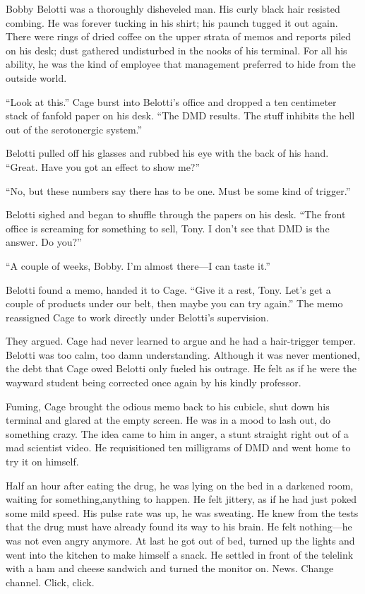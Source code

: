 Bobby Belotti was a thoroughly disheveled man. His curly black hair resisted combing. He was forever tucking in his shirt; his paunch tugged it out again. There were rings of dried coffee on the upper strata of memos and reports piled on his desk; dust gathered undisturbed in the nooks of his terminal. For all his ability, he was the kind of employee that management preferred to hide from the outside world.

“Look at this.” Cage burst into Belotti’s office and dropped a ten centimeter stack of fanfold paper on his desk. “The DMD results. The stuff inhibits the hell out of the serotonergic system.”

Belotti pulled off his glasses and rubbed his eye with the back of his hand. “Great. Have you got an effect to show me?”

“No, but these numbers say there has to be one. Must be some kind of trigger.”

Belotti sighed and began to shuffle through the papers on his desk. “The front office is screaming for something to sell, Tony. I don’t see that DMD is the answer. Do you?”

“A couple of weeks, Bobby. I’m almost there—I can taste it.”

Belotti found a memo, handed it to Cage. “Give it a rest, Tony. Let’s get a couple of products under our belt, then maybe you can try again.” The memo reassigned Cage to work directly under Belotti’s supervision.

They argued. Cage had never learned to argue and he had a hair-trigger temper. Belotti was too calm, too damn understanding. Although it was never mentioned, the debt that Cage owed Belotti only fueled his outrage. He felt as if he were the wayward student being corrected once again by his kindly professor.

Fuming, Cage brought the odious memo back to his cubicle, shut down his terminal and glared at the empty screen. He was in a mood to lash out, do something crazy. The idea came to him in anger, a stunt straight right out of a mad scientist video. He requisitioned ten milligrams of DMD and went home to try it on himself.

Half an hour after eating the drug, he was lying on the bed in a darkened room, waiting for something,anything to happen. He felt jittery, as if he had just poked some mild speed. His pulse rate was up, he was sweating. He knew from the tests that the drug must have already found its way to his brain. He felt nothing—he was not even angry anymore. At last he got out of bed, turned up the lights and went into the kitchen to make himself a snack. He settled in front of the telelink with a ham and cheese sandwich and turned the monitor on. News. Change channel. Click, click.

